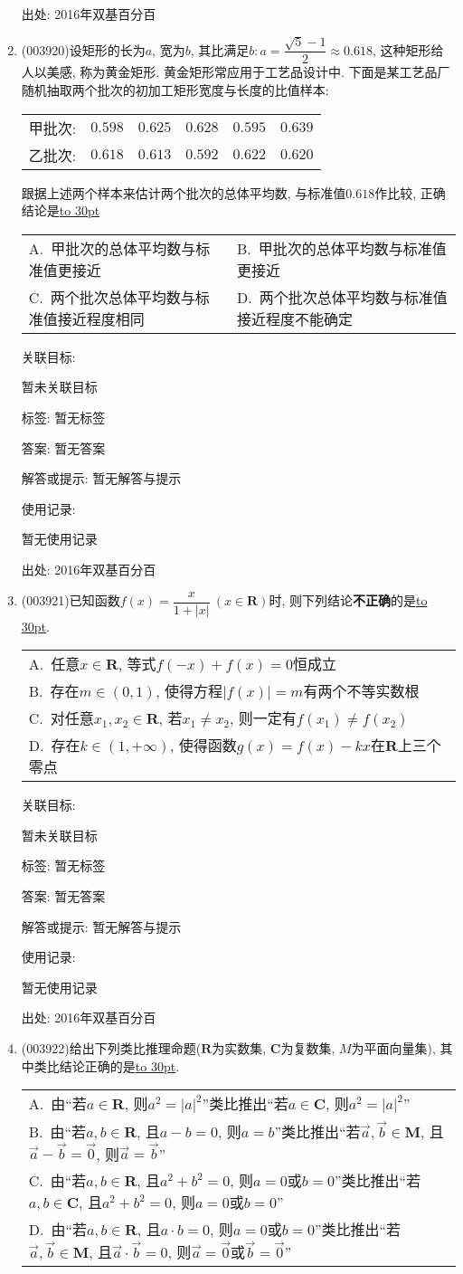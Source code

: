 \documentclass[10pt,a4paper]{article}
\newcommand{\blank}[1]{\underline{\hbox to #1pt{}}}
\newcommand{\onech}[4]{\par\begin{tabular}{p{.9\textwidth}}
A.~#1\\
B.~#2\\
C.~#3\\
D.~#4
\end{tabular}}
\newcommand{\twoch}[4]{\par\begin{tabular}{p{.46\textwidth}p{.46\textwidth}}
A.~#1& B.~#2\\
C.~#3& D.~#4
\end{tabular}}
\begin{document}
\begin{enumerate}[1.]
出处: 2016年双基百分百
\item { (003920)}设矩形的长为$a$, 宽为$b$, 其比满足$b:a=\dfrac{\sqrt{5}-1}{2}\approx 0.618$, 这种矩形给人以美感, 称为黄金矩形. 黄金矩形常应用于工艺品设计中. 下面是某工艺品厂随机抽取两个批次的初加工矩形宽度与长度的比值样本:
\begin{center}
\begin{tabular}{cccccc}
甲批次: & $0.598$ & $0.625$ & $0.628$ & $0.595$ & $0.639$\\
乙批次: & $0.618$ & $0.613$ & $0.592$ & $0.622$ & $0.620$
\end{tabular}
\end{center}
跟据上述两个样本来估计两个批次的总体平均数, 与标准值$0.618$作比较, 正确结论是\blank{30}
\twoch{甲批次的总体平均数与标准值更接近}{甲批次的总体平均数与标准值更接近}{两个批次总体平均数与标准值接近程度相同}{两个批次总体平均数与标准值接近程度不能确定}


关联目标:

暂未关联目标



标签: 暂无标签

答案: 暂无答案

解答或提示: 暂无解答与提示

使用记录:

暂无使用记录


出处: 2016年双基百分百
\item { (003921)}已知函数$f(x)=\dfrac{x}{1+|x|} \ (x\in \mathbf{R})$时, 则下列结论{\bf 不正确}的是\blank{30}.
\onech{任意$x\in \mathbf{R}$, 等式$f(-x)+f(x)=0$恒成立}{存在$m\in (0,1)$, 使得方程$|f(x)|=m$有两个不等实数根}{对任意$x_1,x_2\in \mathbf{R}$, 若$x_1\ne x_2$, 则一定有$f(x_1)\ne f(x_2)$}{存在$k\in (1,+\infty)$, 使得函数$g(x)=f(x)-kx$在$\mathbf{R}$上三个零点}


关联目标:

暂未关联目标



标签: 暂无标签

答案: 暂无答案

解答或提示: 暂无解答与提示

使用记录:

暂无使用记录


出处: 2016年双基百分百
\item { (003922)}给出下列类比推理命题($\mathbf{R}$为实数集, $\mathbf{C}$为复数集, $M$为平面向量集), 其中类比结论正确的是\blank{30}.
\onech{由``若$a\in \mathbf{R}$, 则$a^2=|a|^2$''类比推出``若$a\in \mathbf{C}$, 则$a^2=|a|^2$''}{由``若$a,b\in \mathbf{R}$, 且$a-b=0$, 则$a=b$''类比推出``若$\overrightarrow{a},\overrightarrow{b}\in \mathbf{M}$, 且$\overrightarrow a-\overrightarrow b=\overrightarrow 0$, 则$\overrightarrow a=\overrightarrow b$''}{由``若$a,b\in \mathbf{R}$, 且$a^2+b^2=0$, 则$a=0$或$b=0$''类比推出``若$a,b\in \mathbf{C}$, 且$a^2+b^2=0$, 则$a=0$或$b=0$''}{由``若$a,b\in \mathbf{R}$, 且$a\cdot b=0$, 则$a=0$或$b=0$''类比推出``若$\overrightarrow a, \overrightarrow b\in \mathbf{M}$, 且$\overrightarrow a\cdot \overrightarrow b=0$, 则$\overrightarrow a=\overrightarrow 0$或$\overrightarrow b=\overrightarrow 0$''}



\end{enumerate}
\end{document}
